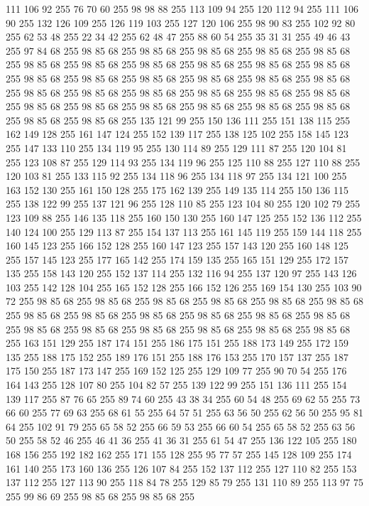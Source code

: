 111 106 92 255 76 70 60 255 98 98 88 255 113 109 94 255 120 112 94 255 111 106 90 255 132 126 109 255 126 119 103 255 127 120 106 255 98 90 83 255 102 92 80 255 62 53 48 255 22 34 42 255 62 48 47 255 88 60 54 255 35 31 31 255 49 46 43 255 97 84 68 255 98 85 68 255 98 85 68 255 98 85 68 255 98 85 68 255 98 85 68 255 98 85 68 255 98 85 68 255 98 85 68 255 98 85 68 255 98 85 68 255 98 85 68 255 98 85 68 255 98 85 68 255 98 85 68 255 98 85 68 255 98 85 68 255 98 85 68 255 98 85 68 255 98 85 68 255 98 85 68 255 98 85 68 255 98 85 68 255 98 85 68 255 98 85 68 255 98 85 68 255 98 85 68 255 98 85 68 255 98 85 68 255 98 85 68 255 98 85 68 255 98 85 68 255 135 121 99 255 150 136 111 255 151 138 115 255 162 149 128 255 161 147 124 255 152 139 117 255 138 125 102 255 158 145 123 255 147 133 110 255 134 119 95 255 130 114 89 255 129 111 87 255 120 104 81 255 123 108 87 255 129 114 93 255
134 119 96 255 125 110 88 255 127 110 88 255 120 103 81 255 133 115 92 255 134 118 96 255 134 118 97 255 134 121 100 255 163 152 130 255 161 150 128 255 175 162 139 255 149 135 114 255 150 136 115 255 138 122 99 255 137 121 96 255 128 110 85 255 123 104 80 255 120 102 79 255 123 109 88 255 146 135 118 255 160 150 130 255 160 147 125 255 152 136 112 255 140 124 100 255 129 113 87 255 154 137 113 255 161 145 119 255 159 144 118 255 160 145 123 255 166 152 128 255 160 147 123 255 157 143 120 255 160 148 125 255 157 145 123 255 177 165 142 255 174 159 135 255 165 151 129 255 172 157 135 255 158 143 120 255 152 137 114 255 132 116 94 255 137 120 97 255 143 126 103 255 142 128 104 255 165 152 128 255 166 152 126 255 169 154 130 255 103 90 72 255 98 85 68 255 98 85 68 255 98 85 68 255 98 85 68 255 98 85 68 255 98 85 68 255 98 85 68 255 98 85 68 255 98 85 68 255 98 85 68 255 98 85 68 255 98 85 68 255 98 85 68 255 98 85 68 255 98 85 68 255 98 85 68 255
98 85 68 255 98 85 68 255 163 151 129 255 187 174 151 255 186 175 151 255 188 173 149 255 172 159 135 255 188 175 152 255 189 176 151 255 188 176 153 255 170 157 137 255 187 175 150 255 187 173 147 255 169 152 125 255 129 109 77 255 90 70 54 255 176 164 143 255 128 107 80 255 104 82 57 255 139 122 99 255 151 136 111 255 154 139 117 255 87 76 65 255 89 74 60 255 43 38 34 255 60 54 48 255 69 62 55 255 73 66 60 255 77 69 63 255 68 61 55 255 64 57 51 255 63 56 50 255 62 56 50 255 95 81 64 255 102 91 79 255 65 58 52 255 66 59 53 255 66 60 54 255 65 58 52 255 63 56 50 255 58 52 46 255 46 41 36 255 41 36 31 255 61 54 47 255 136 122 105 255 180 168 156 255 192 182 162 255 171 155 128 255 95 77 57 255 145 128 109 255 174 161 140 255 173 160 136 255 126 107 84 255 152 137 112 255 127 110 82 255 153 137 112 255 127 113 90 255 118 84 78 255 129 85 79 255 131 110 89 255 113 97 75 255 99 86 69 255 98 85 68 255 98 85 68 255
